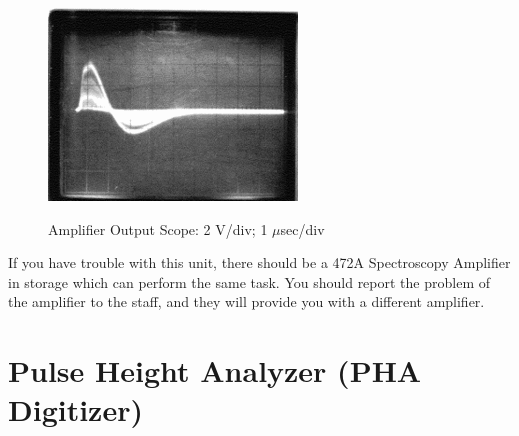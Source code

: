 \documentclass{../lab}
\begin{document}
\begin{enumerate}
    \begin{figure}[h]
        \centering
        \href{http://experimentationlab.berkeley.edu/sites/default/files/images/250px-GMAimage004.gif}{\includegraphics[width=0.5\linewidth]{images/250px-GMAimage004.png}}
        \caption{Amplifier Output Scope: 2 V/div; 1 $\mu$sec/div}
        \label{fig:250px-GMAimage004}
    \end{figure}

    If you have trouble with this unit, there should be a 472A Spectroscopy Amplifier in storage which can perform the same task. You should report the problem of the amplifier to the staff, and they will provide you with a different amplifier.

\end{enumerate}

\section{Pulse Height Analyzer (PHA Digitizer)}
\end{document}
